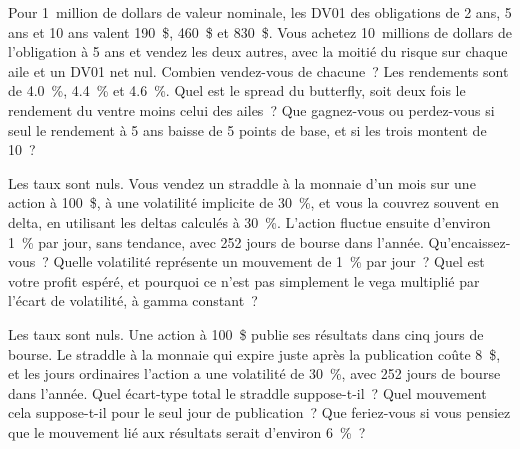 \begin{question}\label{iq:iv2:options-and-bond-arithmetic-at-speed:23}
Pour 1~million de dollars de valeur nominale, les DV01 des obligations de 2 ans, 5 ans et 10 ans valent 190~\$, 460~\$ et 830~\$. Vous achetez 10~millions de dollars de l'obligation à 5 ans et vendez les deux autres, avec la moitié du risque sur chaque aile et un DV01 net nul. Combien vendez-vous de chacune~? Les rendements sont de 4.0~\%, 4.4~\% et 4.6~\%. Quel est le spread du butterfly, soit deux fois le rendement du ventre moins celui des ailes~? Que gagnez-vous ou perdez-vous si seul le rendement à 5 ans baisse de 5 points de base, et si les trois montent de 10~?
\end{question}

\begin{question}\label{iq:iv2:options-and-bond-arithmetic-at-speed:24}
Les taux sont nuls. Vous vendez un straddle à la monnaie d'un mois sur une action à 100~\$, à une volatilité implicite de 30~\%, et vous la couvrez souvent en delta, en utilisant les deltas calculés à 30~\%. L'action fluctue ensuite d'environ 1~\% par jour, sans tendance, avec 252 jours de bourse dans l'année. Qu'encaissez-vous~? Quelle volatilité représente un mouvement de 1~\% par jour~? Quel est votre profit espéré, et pourquoi ce n'est pas simplement le vega multiplié par l'écart de volatilité, à gamma constant~?
\end{question}

\begin{question}\label{iq:iv2:options-and-bond-arithmetic-at-speed:25}
Les taux sont nuls. Une action à 100~\$ publie ses résultats dans cinq jours de bourse. Le straddle à la monnaie qui expire juste après la publication coûte 8~\$, et les jours ordinaires l'action a une volatilité de 30~\%, avec 252 jours de bourse dans l'année. Quel écart-type total le straddle suppose-t-il~? Quel mouvement cela suppose-t-il pour le seul jour de publication~? Que feriez-vous si vous pensiez que le mouvement lié aux résultats serait d'environ 6~\%~?
\end{question}
